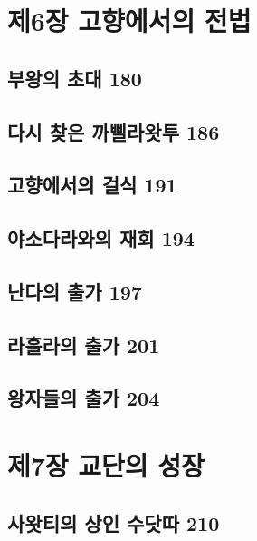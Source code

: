 \documentclass[12pt, a4paper, oneside]{book}
\let\stdsection\section
\renewcommand\section{\newpage\stdsection}
\begin{document}
	\chapter{제6장 고향에서의 전법}
	\noptcrule
	\parttoc				

	\section{부왕의 초대 180 }

	\section{다시 찾은 까삘라왓투 186 }

	\section{고향에서의 걸식 191 }

	\section{야소다라와의 재회 194 }

	\section{난다의 출가 197 }

	\section{라훌라의 출가 201 }

	\section{왕자들의 출가 204}





	\chapter{제7장 교단의 성장}
	\noptcrule
	\parttoc				

	\section{사왓티의 상인 수닷따 210 }
\end{document}
